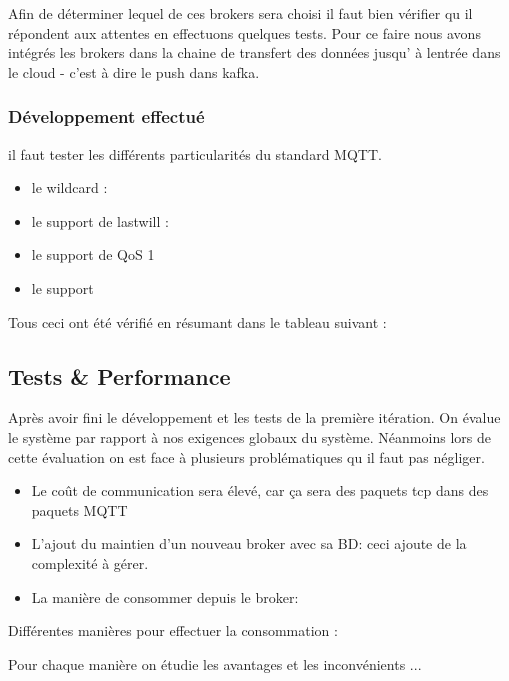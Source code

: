         Afin de déterminer lequel de ces brokers sera choisi il faut bien vérifier qu il répondent aux attentes en effectuons quelques tests. 
        Pour ce faire nous avons intégrés les brokers dans la chaine de transfert des données jusqu' à lentrée dans le cloud - 
        c'est à dire le push dans kafka.


        \subsubsection{Développement effectué}
            il faut tester les différents particularités du standard MQTT. 
            \begin{itemize}
                \item le wildcard : 
                \item le support de lastwill : 
                \item le support de QoS 1 
                \item le support 
            \end{itemize} 
           
            Tous ceci ont été vérifié en résumant dans le tableau suivant : 

    \subsection{Tests \& Performance}
    Après avoir fini le développement et les tests de la première itération. 
    On évalue le système par rapport à nos exigences globaux du système. 
    Néanmoins lors de cette évaluation on est face à plusieurs problématiques qu il faut pas négliger. 

    \begin{itemize}
        \renewcommand{\labelitemi}{$\bullet$}
        \item Le coût de communication sera élevé, car ça sera des paquets tcp dans des paquets MQTT 
        \item L'ajout du maintien d’un nouveau broker avec sa BD: ceci ajoute de la complexité à gérer.
        \item La manière de consommer depuis le broker: 
    \end{itemize}

    Différentes manières pour effectuer la consommation : 

    Pour chaque manière on étudie les avantages et les inconvénients ... 



